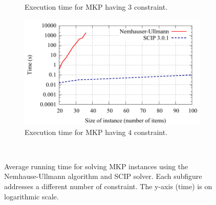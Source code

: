 \documentclass[a4paper]{article}
\newcommand{\scipnucaption}[1]{ Execution time for MKP having $#1$ constraint. }
\begin{document}
\begin{figure}[h]
\begin{subfigure}[t]{0.48\textwidth}
    \caption{\scipnucaption{3}}
    \label{fig:mouse}
  \end{subfigure}
  \quad
  \begin{subfigure}[t]{0.48\textwidth}
    \includegraphics[width=\textwidth]{../../../experiments/mkp-scip-nu/plots/scip-nu-4}
    \caption{\scipnucaption{4}}
    \label{fig:mouse}
  \end{subfigure}
  \\ \vspace{8pt}
  \caption{Average running time for solving MKP instances
  using the Nemhause-Ullmann algorithm and SCIP solver.
  Each subfigure addresses a different number of constraint.
  The y-axis (time) is on logarithmic scale.
  }
  \label{fig:scip-nu}
\end{figure}
\end{document}

